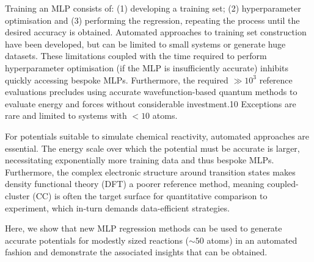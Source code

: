 \documentclass[twoside,twocolumn,9pt]{article}
\begin{document}
Training an MLP consists of: (1) developing a training set; (2) hyperparameter optimisation and (3) performing the regression, repeating the process until the desired accuracy is obtained. Automated approaches to training set construction have been developed,\cite{Smith2018, Young2021gap, Miksch2021} but can be limited to small systems or generate huge datasets. These limitations coupled with the time required to perform hyperparameter optimisation (if the MLP is insufficiently accurate) inhibits quickly accessing bespoke MLPs. Furthermore, the required $\gg 10^3$ reference evaluations precludes using accurate wavefunction-based quantum methods to evaluate energy and forces without considerable investment.10 Exceptions are rare and limited to systems with $<10$ atoms.\cite{Young2021gap, Dral2020}

For potentials suitable to simulate chemical reactivity, automated approaches are essential. The energy scale over which the potential must be accurate is larger, necessitating exponentially more training data and thus bespoke MLPs. Furthermore, the complex electronic structure around transition states makes density functional theory (DFT) a poorer reference method,\cite{Zhao2005} meaning coupled-cluster (CC) is often the target surface for quantitative comparison to experiment, which in-turn demands data-efficient strategies.

Here, we show that new MLP regression methods\cite{Batzner2021, Kovacs2021} can be used to generate accurate potentials for modestly sized reactions ($\sim50$ atoms) in an automated fashion and demonstrate the associated insights that can be obtained. 
\end{document}
